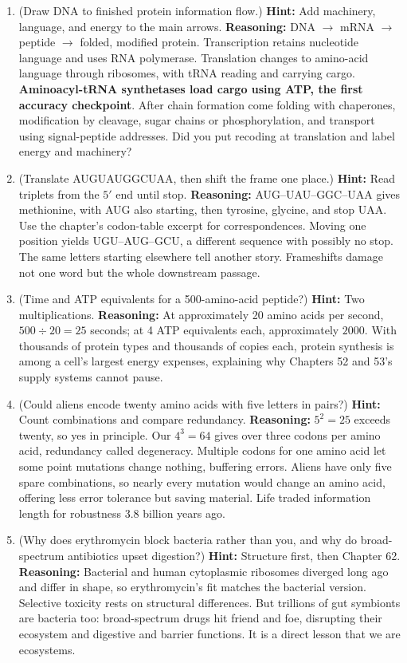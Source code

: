 \begin{enumerate}[itemsep=3pt]
\item (Draw DNA to finished protein information flow.) \textbf{Hint:} Add machinery, language, and energy to the main arrows. \textbf{Reasoning:} DNA $\rightarrow$ mRNA $\rightarrow$ peptide $\rightarrow$ folded, modified protein. Transcription retains nucleotide language and uses RNA polymerase. Translation changes to amino-acid language through ribosomes, with tRNA reading and carrying cargo. \textbf{Aminoacyl-tRNA synthetases load cargo using ATP, the first accuracy checkpoint}. After chain formation come folding with chaperones, modification by cleavage, sugar chains or phosphorylation, and transport using signal-peptide addresses. Did you put recoding at translation and label energy and machinery?
\item (Translate AUGUAUGGCUAA, then shift the frame one place.) \textbf{Hint:} Read triplets from the $5'$ end until stop. \textbf{Reasoning:} AUG--UAU--GGC--UAA gives methionine, with AUG also starting, then tyrosine, glycine, and stop UAA. Use the chapter's codon-table excerpt for correspondences. Moving one position yields UGU--AUG--GCU, a different sequence with possibly no stop. The same letters starting elsewhere tell another story. Frameshifts damage not one word but the whole downstream passage.
\item (Time and ATP equivalents for a 500-amino-acid peptide?) \textbf{Hint:} Two multiplications. \textbf{Reasoning:} At approximately 20 amino acids per second, $500\div 20=25$ seconds; at 4 ATP equivalents each, approximately $2000$. With thousands of protein types and thousands of copies each, protein synthesis is among a cell's largest energy expenses, explaining why Chapters 52 and 53's supply systems cannot pause.
\item (Could aliens encode twenty amino acids with five letters in pairs?) \textbf{Hint:} Count combinations and compare redundancy. \textbf{Reasoning:} $5^2=25$ exceeds twenty, so yes in principle. Our $4^3=64$ gives over three codons per amino acid, redundancy called degeneracy. Multiple codons for one amino acid let some point mutations change nothing, buffering errors. Aliens have only five spare combinations, so nearly every mutation would change an amino acid, offering less error tolerance but saving material. Life traded information length for robustness 3.8 billion years ago.
\item (Why does erythromycin block bacteria rather than you, and why do broad-spectrum antibiotics upset digestion?) \textbf{Hint:} Structure first, then Chapter 62. \textbf{Reasoning:} Bacterial and human cytoplasmic ribosomes diverged long ago and differ in shape, so erythromycin's fit matches the bacterial version. Selective toxicity rests on structural differences. But trillions of gut symbionts are bacteria too: broad-spectrum drugs hit friend and foe, disrupting their ecosystem and digestive and barrier functions. It is a direct lesson that we are ecosystems.

\end{enumerate}
